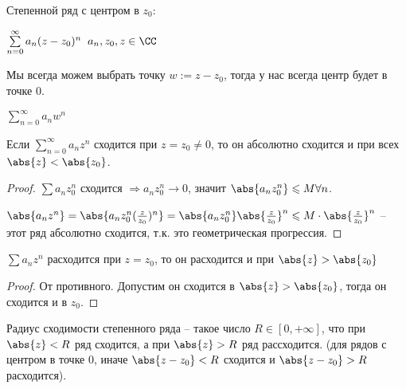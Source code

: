 

\begin{definition}\slashns
    
    Степенной ряд с центром в $z_0$:
    
    $\sum\limits_{n = 0}^{\infty} a_n(z - z_0)^n \;\; a_n,z_0, z \in \CC$
    
    Мы всегда можем выбрать точку $w := z - z_0$, тогда у нас всегда центр будет в точке 0.
    
    $\sum\limits_{n = 0}^{\infty} a_nw^n$
\end{definition}

\begin{theorem}\slashns
    
    Если $\sum\limits_{n = 0}^{\infty} a_nz^n$ сходится при $z = z_0 \not = 0$, то он абсолютно сходится и при всех $\abs{z} < \abs{z_0}$.
\end{theorem}

\begin{proof}\slashns
    
    $\sum a_nz_0^n$ сходится $\Rightarrow a_nz_0^n \to 0$, значит $\abs{a_nz_0^n} \leqslant M \forall n$.
    
    $\abs{a_n z^n} = \abs{ a_nz_0^n (\frac{z}{z_0})^n } = \abs{ a_nz_0^n} \abs{ \frac{z}{z_0} }^n \leqslant M \cdot \abs{ \frac{z}{z_0} }^n$ -- этот ряд абсолютно сходится, т.к. это геометрическая прогрессия.

\end{proof}

\begin{consequence}\slashns
    
    $\sum a_nz^n$ расходится при $z = z_0$, то он расходится и при $\abs{z} > \abs{z_0}$
\end{consequence}

\begin{proof}\slashns
    
    От противного. Допустим он сходится в $\abs{z} > \abs{z_0}$, тогда он сходится и в $z_0$.
\end{proof}

\begin{definition}\slashns
    
    Радиус сходимости степенного ряда -- такое число $R \in [0, +\infty]$, что при $\abs{z} < R$ ряд сходится, а при $\abs{z} > R$ ряд рассходится. (для рядов с центром в точке 0, иначе $\abs{z - z_0} < R$ сходится и $\abs{z - z_0} > R$ расходится).
\end{definition}

